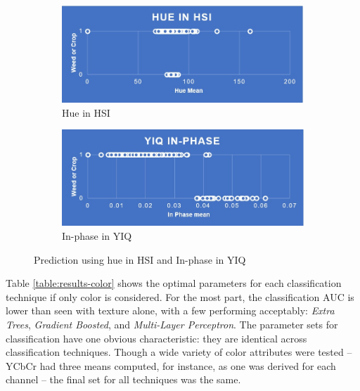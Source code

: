 \documentclass[letterpaper]{report}
\begin{document}
\begin{figure}[H]
	\begin{subfigure}[h]{0.48\linewidth}
		\includegraphics[width=1\linewidth]{./figures/hsi-hue.jpg}
		\caption{Hue in HSI}
		\label{subfig:hue}	
	\end{subfigure}
	\hfill
	\begin{subfigure}[h]{0.48\linewidth}
		\includegraphics[width=1\linewidth]{./figures/yiq-in-phase.jpg}
		\caption{In-phase in YIQ}
		\label{subfig:in_phase}		
	\end{subfigure}%
	\caption[Prediction using hue in \gls{HSI} and In-phase in YIQ]{Prediction using hue in \gls{HSI} and In-phase in YIQ}
	\label{fig:hue_vs_inphase}
\end{figure}

Table \ref{table:results-color} shows the optimal parameters for each classification technique if only color is considered. For the most part, the classification AUC is lower than seen with texture alone, with a few performing acceptably: \textit{Extra Trees}, \textit{Gradient Boosted}, and \textit{Multi-Layer Perceptron}.  The parameter sets for classification have one obvious characteristic: they are identical across classification techniques. Though a wide variety of color attributes were tested -- YCbCr had three means computed, for instance, as one was derived for each channel -- the final set for all techniques was the same.
\end{document}
